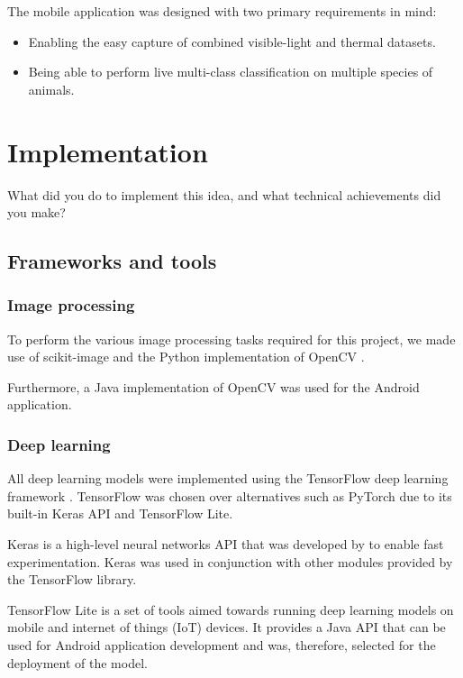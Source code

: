 \documentclass{l4proj}
\begin{document}
The mobile application was designed with two primary requirements in mind:

\begin{itemize}
  \item Enabling the easy capture of combined visible-light and thermal datasets.
  \item Being able to perform live multi-class classification on multiple species of animals.
\end{itemize}



\chapter{Implementation}
What did you do to implement this idea, and what technical achievements did you make?

\section{Frameworks and tools}

\subsection{Image processing}

To perform the various image processing tasks required for this project, we made use of scikit-image \citep{van_der_walt_scikit-image_2014} and the Python implementation of OpenCV \citep{bradski_opencv_2000}.

Furthermore, a Java implementation of OpenCV was used for the Android application.


\subsection{Deep learning}

All deep learning models were implemented using the TensorFlow deep learning framework \citep{abadi_TensorFlow_2016}. TensorFlow was chosen over alternatives such as PyTorch due to its built-in Keras API and TensorFlow Lite.

Keras is a high-level neural networks API that was developed by \citet{chollet_keras_2015} to enable fast experimentation. Keras was used in conjunction with other modules provided by the TensorFlow library. 

TensorFlow Lite is a set of tools aimed towards running deep learning models on mobile and internet of things (IoT) devices. It provides a Java API that can be used for Android application development and was, therefore, selected for the deployment of the model.
\end{document}
